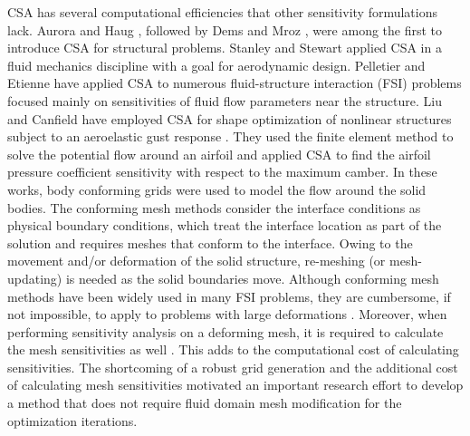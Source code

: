 CSA has several computational efficiencies that other sensitivity formulations lack. Aurora and Haug \cite{Arora}, followed by Dems and Mroz \cite{Dems-Mroz}, were among the first to introduce CSA for structural problems. Stanley and Stewart \cite{stanley2002design} applied CSA in a fluid mechanics discipline with a goal for aerodynamic design. Pelletier and Etienne have applied CSA to numerous fluid-structure interaction (FSI) problems \cite{etienne2005general} focused mainly on sensitivities of fluid flow parameters near the structure. Liu and Canfield have employed CSA for shape optimization of nonlinear structures subject to an aeroelastic gust response \cite{liu2013equivalence}. They used the finite element method to solve the potential flow around an airfoil and applied CSA to find the airfoil pressure coefficient sensitivity with respect to the maximum camber. In these works, body conforming grids were used to model the flow around the solid bodies. The conforming mesh methods consider the interface conditions as physical boundary conditions, which treat the interface location as part of the solution and requires meshes that conform to the interface. Owing to the movement and/or deformation of the solid structure, re-meshing (or mesh-updating) is needed as the solid boundaries move. Although conforming mesh methods have been widely used in many FSI problems, they are cumbersome, if not impossible, to apply to problems with large deformations \cite{sahin2009arbitrary}. Moreover, when performing sensitivity analysis on a deforming mesh, it is required to calculate the mesh sensitivities as well \cite{liu2013boundary}. This adds to the computational cost of calculating  sensitivities. The shortcoming of a robust grid generation and the additional cost of calculating mesh sensitivities motivated an important research effort to develop a method that does not require fluid domain mesh modification for the optimization iterations.
